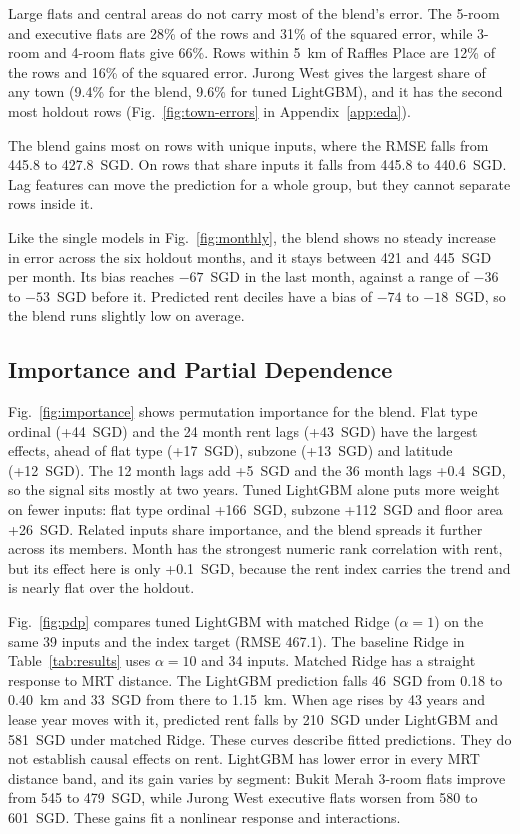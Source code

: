 Large flats and central areas do not carry most of the blend's error. The 5-room and executive flats are 28\% of the rows and 31\% of the squared error, while 3-room and 4-room flats give 66\%. Rows within 5~km of Raffles Place are 12\% of the rows and 16\% of the squared error. Jurong West gives the largest share of any town (9.4\% for the blend, 9.6\% for tuned LightGBM), and it has the second most holdout rows (Fig.~\ref{fig:town-errors} in Appendix~\ref{app:eda}).

The blend gains most on rows with unique inputs, where the RMSE falls from 445.8 to 427.8~SGD. On rows that share inputs it falls from 445.8 to 440.6~SGD. Lag features can move the prediction for a whole group, but they cannot separate rows inside it.

Like the single models in Fig.~\ref{fig:monthly}, the blend shows no steady increase in error across the six holdout months, and it stays between 421 and 445~SGD per month. Its bias reaches $-67$~SGD in the last month, against a range of $-36$ to $-53$~SGD before it. Predicted rent deciles have a bias of $-74$ to $-18$~SGD, so the blend runs slightly low on average.

\subsection{Importance and Partial Dependence}\label{sec:interpretation}

Fig.~\ref{fig:importance} shows permutation importance for the blend. Flat type ordinal (+44~SGD) and the 24 month rent lags (+43~SGD) have the largest effects, ahead of flat type (+17~SGD), subzone (+13~SGD) and latitude (+12~SGD). The 12 month lags add +5~SGD and the 36 month lags +0.4~SGD, so the signal sits mostly at two years. Tuned LightGBM alone puts more weight on fewer inputs: flat type ordinal +166~SGD, subzone +112~SGD and floor area +26~SGD. Related inputs share importance, and the blend spreads it further across its members. Month has the strongest numeric rank correlation with rent, but its effect here is only +0.1~SGD, because the rent index carries the trend and is nearly flat over the holdout.

Fig.~\ref{fig:pdp} compares tuned LightGBM with matched Ridge ($\alpha = 1$) on the same 39 inputs and the index target (RMSE 467.1). The baseline Ridge in Table~\ref{tab:results} uses $\alpha = 10$ and 34 inputs. Matched Ridge has a straight response to MRT distance. The LightGBM prediction falls 46~SGD from 0.18 to 0.40~km and 33~SGD from there to 1.15~km. When age rises by 43 years and lease year moves with it, predicted rent falls by 210~SGD under LightGBM and 581~SGD under matched Ridge. These curves describe fitted predictions. They do not establish causal effects on rent. LightGBM has lower error in every MRT distance band, and its gain varies by segment: Bukit Merah 3-room flats improve from 545 to 479~SGD, while Jurong West executive flats worsen from 580 to 601~SGD. These gains fit a nonlinear response and interactions.
